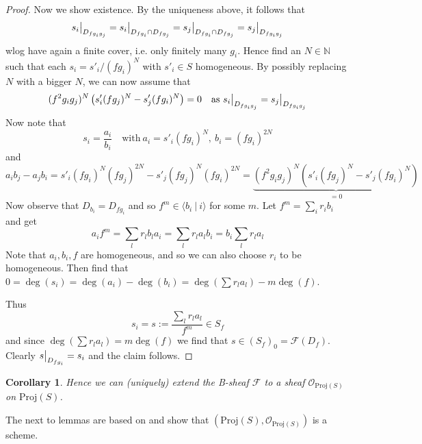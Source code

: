 \documentclass{scrartcl}
\newcommand{\N}{\mathbb{N}}
\newcommand{\Proj}{\mathrm{Proj}}
\renewcommand{\O}{\mathcal{O}}
\newcommand\restr[2]{{
    \left.\kern-\nulldelimiterspace
    #1
    \vphantom{\big|}
    \right|_{#2}
}}
\newtheorem{corollary}[prop]{Corollary}
\theoremstyle{definition}
\begin{document}
\begin{proof}
    Now we show existence.
    By the uniqueness above, it follows that
    \begin{equation*}
        \restr{s_i}{D_{fg_ig_j}} = \restr{s_i}{D_{fg_i} \cap D_{fg_j}} = \restr{s_j}{D_{fg_i} \cap D_{fg_j}} = \restr{s_j}{D_{fg_ig_j}}
    \end{equation*}
    wlog have again a finite cover, i.e. only finitely many $g_i$.
    Hence find an $N \in \N$ such that each $s_i = s'_i / (fg_i)^N$ with $s'_i \in S$ homogeneous.
    By possibly replacing $N$ with a bigger $N$, we can now assume that
    \begin{equation*}
        (f^2g_ig_j)^N \left( s'_i (fg_j)^N - s'_j (fg_i)^N \right) = 0 \quad \text{as $\restr{s_i}{D_{fg_ig_j}} = \restr{s_j}{D_{fg_ig_j}}$}
    \end{equation*}
    Now note that
    \begin{equation*}
        s_i = \frac {a_i} {b_i} \quad \text{with}\ a_i = s'_i(fg_i)^N, \ b_i = (fg_i)^{2N}
    \end{equation*}
    and
    \begin{equation*}
        a_i b_j - a_j b_i = s'_i (fg_i)^N (fg_j)^{2N} - s'_j (fg_j)^N (fg_i)^{2N} = \underbrace{(f^2g_ig_j)^N \left(s'_i (fg_j)^N - s'_j (fg_i)^N \right)}_{= 0}
    \end{equation*}
    Now observe that $D_{b_i} = D_{fg_i}$ and so $f^m \in \langle b_i \ | \ i \rangle$ for some $m$.
    Let $f^m = \sum_i r_i b_i$ and get
    \begin{equation*}
        a_i f^m = \sum_l r_l b_l a_i = \sum_l r_l a_l b_i = b_i \sum_l r_l a_l
    \end{equation*}
    Note that $a_i, b_i, f$ are homogeneous, and so we can also choose $r_i$ to be homogeneous.
    Then find that $0 = \deg(s_i) = \deg(a_i) - \deg(b_i) = \deg(\sum r_l a_l) - m\deg(f)$.

    Thus
    \begin{equation*}
        s_i = s := \frac {\sum_l r_l a_l} {f^m} \in S_f
    \end{equation*}
    and since $\deg(\sum r_l a_l) = m\deg(f)$ we find that $s \in (S_f)_0 = \mathcal{F}(D_f)$.
    Clearly $\restr{s}{D_{fg_i}} = s_i$ and the claim follows.
\end{proof}
\begin{corollary}
    Hence we can (uniquely) extend the B-sheaf $\mathcal{F}$ to a sheaf $\O_{\Proj(S)}$ on $\Proj(S)$.
\end{corollary}
The next to lemmas are based on \cite[II.2.5]{hartshorne} and show that $(\Proj(S), \O_{\Proj(S)})$ is a scheme.
\end{document}
